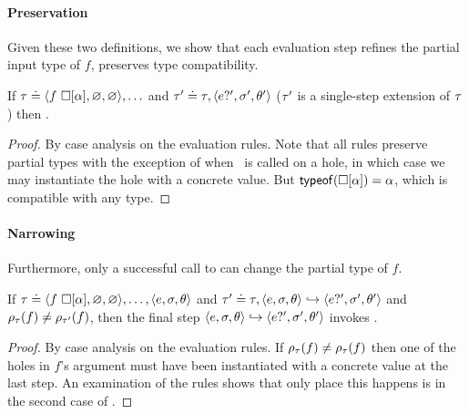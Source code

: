 \paragraph{Preservation}
Given these two definitions, we show that each evaluation step
refines the partial input type of $f$, \ie preserves type compatibility.
%
\begin{lem}
\label{lem:refine-partial}
If $\tau \doteq \langle f\ \square[\alpha], \varnothing, \varnothing \rangle,\ldots$ and
$\tau' \doteq \tau, \langle e?', \sigma', \theta' \rangle$ (\ie $\tau'$ is a single-step
extension of $\tau$)
%
%
then .
\end{lem}
\begin{proof}
  By case analysis on the evaluation rules.
  Note that all rules preserve partial types with the exception of when
  \forcesym\ is called on a hole, in which case we may instantiate the hole with
  a concrete value.
  But $\mathsf{typeof}(\square[\alpha]) = \alpha$, which is compatible with any type.
\end{proof}

\paragraph{Narrowing}
%
Furthermore, only a successful call to \forcesym can change the partial type of $f$.
%
\begin{lem}
\label{lem:force-inst}
If
$\tau \doteq \langle f\ \square[\alpha], \varnothing, \varnothing \rangle,\ldots,\langle e, \sigma, \theta \rangle$
and
$\tau' \doteq \tau, \langle e, \sigma, \theta \rangle \hookrightarrow \langle e?', \sigma', \theta' \rangle$
and
$\rho_{\tau}(f) \neq \rho_{\tau'}(f)$,
then the final step $\langle e, \sigma, \theta \rangle \hookrightarrow \langle e?', \sigma', \theta' \rangle$ invokes \forcesym.
\end{lem}

\begin{proof}
  By case analysis on the evaluation rules.
  If $\rho_{\tau}(f) \neq \rho_{\tau}(f)$ then one of the holes in $f$'s
  argument must have been instantiated with a concrete value at the last step.
  An examination of the rules shows that only place this happens is
  in the second case of \forcesym.
\end{proof}

